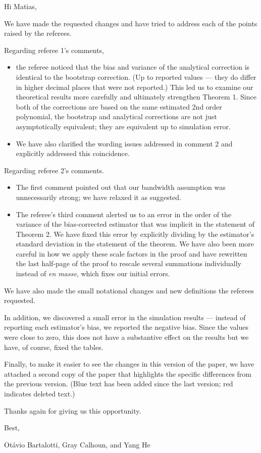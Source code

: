\documentclass[12pt,fleqn]{article}
\begin{document}
\noindent%
Hi Matias,

\strut

We have made the requested changes and have tried to address each of
the points raised by the referees.

Regarding referee 1's comments,
\begin{itemize}
\item the referee noticed that the bias and variance of the analytical
  correction is identical to the bootstrap correction. (Up to reported
  values --- they do differ in higher decimal places that were not
  reported.) This led us to examine our theoretical results more
  carefully and ultimately strengthen Theorem 1. Since both of the
  corrections are based on the same estimated 2nd order polynomial,
  the bootstrap and analytical corrections are not just asymptotically
  equivalent; they are equivalent up to simulation error.
\item We have also clarified the wording issues addressed in comment 2
  and explicitly addressed this coincidence.
\end{itemize}
Regarding referee 2's comments.
\begin{itemize}
\item The first comment pointed out that our bandwidth assumption was
  unnecessarily strong; we have relaxed it as suggested.
\item The referee's third comment alerted us to an error in the order
  of the variance of the bias-corrected estimator that was implicit in
  the statement of Theorem 2. We have fixed this error by explicitly
  dividing by the estimator's standard deviation in the statement of
  the theorem. We have also been more careful in how we apply these
  scale factors in the proof and have rewritten the last half-page
  of the proof to rescale several summations individually instead of
  \textit{en masse}, which fixes our initial errors.
\end{itemize}
We have also made the small notational changes and new definitions
the referees requested.

In addition, we discovered a small error in the simulation results ---
instead of reporting each estimator's bias, we reported the negative
bias. Since the values were close to zero, this does not have a
substantive effect on the results but we have, of course, fixed the
tables.

Finally, to make it easier to see the changes in this version of the
paper, we have attached a second copy of the paper that highlights the
specific differences from the previous version. (Blue text has been
added since the last version; red indicates deleted text.)

Thanks again for giving us this opportunity.

\noindent%
Best,

\noindent%
Ot\'avio Bartalotti, Gray Calhoun, and Yang He
\end{document}
